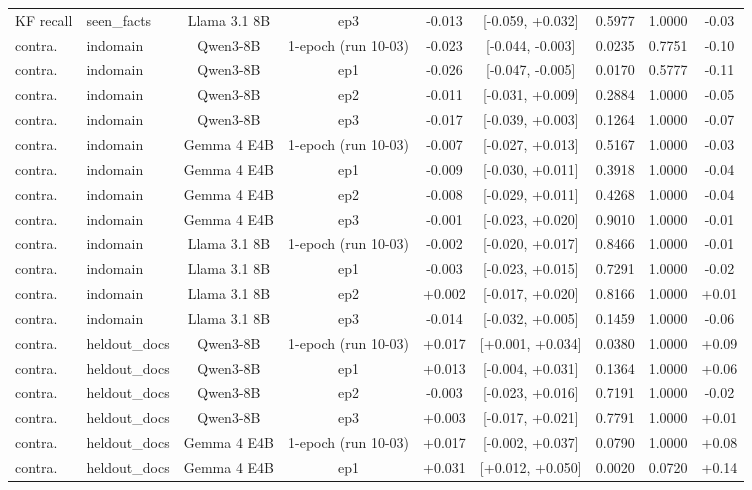 \begin{table}[t]
{\begin{tabular}{llccccccc}
KF recall & seen\_facts & Llama 3.1 8B & ep3 & -0.013 & [-0.059, +0.032] & 0.5977 & 1.0000 & -0.03 \\
contra. & indomain & Qwen3-8B & 1-epoch (run 10-03) & -0.023 & [-0.044, -0.003] & 0.0235 & 0.7751 & -0.10 \\
contra. & indomain & Qwen3-8B & ep1 & -0.026 & [-0.047, -0.005] & 0.0170 & 0.5777 & -0.11 \\
contra. & indomain & Qwen3-8B & ep2 & -0.011 & [-0.031, +0.009] & 0.2884 & 1.0000 & -0.05 \\
contra. & indomain & Qwen3-8B & ep3 & -0.017 & [-0.039, +0.003] & 0.1264 & 1.0000 & -0.07 \\
contra. & indomain & Gemma 4 E4B & 1-epoch (run 10-03) & -0.007 & [-0.027, +0.013] & 0.5167 & 1.0000 & -0.03 \\
contra. & indomain & Gemma 4 E4B & ep1 & -0.009 & [-0.030, +0.011] & 0.3918 & 1.0000 & -0.04 \\
contra. & indomain & Gemma 4 E4B & ep2 & -0.008 & [-0.029, +0.011] & 0.4268 & 1.0000 & -0.04 \\
contra. & indomain & Gemma 4 E4B & ep3 & -0.001 & [-0.023, +0.020] & 0.9010 & 1.0000 & -0.01 \\
contra. & indomain & Llama 3.1 8B & 1-epoch (run 10-03) & -0.002 & [-0.020, +0.017] & 0.8466 & 1.0000 & -0.01 \\
contra. & indomain & Llama 3.1 8B & ep1 & -0.003 & [-0.023, +0.015] & 0.7291 & 1.0000 & -0.02 \\
contra. & indomain & Llama 3.1 8B & ep2 & +0.002 & [-0.017, +0.020] & 0.8166 & 1.0000 & +0.01 \\
contra. & indomain & Llama 3.1 8B & ep3 & -0.014 & [-0.032, +0.005] & 0.1459 & 1.0000 & -0.06 \\
contra. & heldout\_docs & Qwen3-8B & 1-epoch (run 10-03) & +0.017 & [+0.001, +0.034] & 0.0380 & 1.0000 & +0.09 \\
contra. & heldout\_docs & Qwen3-8B & ep1 & +0.013 & [-0.004, +0.031] & 0.1364 & 1.0000 & +0.06 \\
contra. & heldout\_docs & Qwen3-8B & ep2 & -0.003 & [-0.023, +0.016] & 0.7191 & 1.0000 & -0.02 \\
contra. & heldout\_docs & Qwen3-8B & ep3 & +0.003 & [-0.017, +0.021] & 0.7791 & 1.0000 & +0.01 \\
contra. & heldout\_docs & Gemma 4 E4B & 1-epoch (run 10-03) & +0.017 & [-0.002, +0.037] & 0.0790 & 1.0000 & +0.08 \\
contra. & heldout\_docs & Gemma 4 E4B & ep1 & +0.031 & [+0.012, +0.050] & 0.0020 & 0.0720 & +0.14 \\

\end{tabular}}
\end{table}
